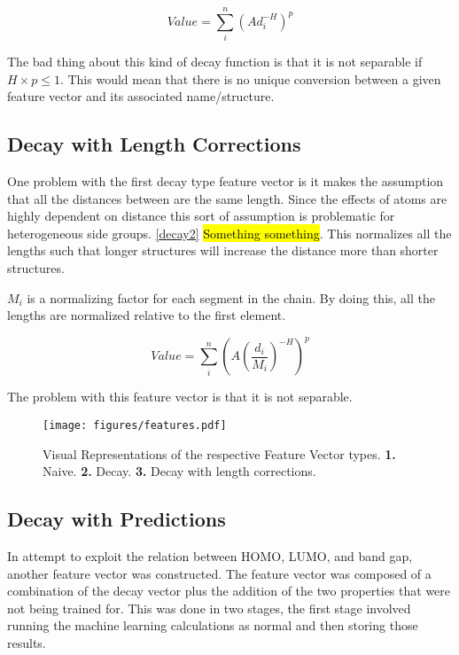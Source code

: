 \documentclass[10pt]{article}
\begin{document}
\begin{equation}\label{decay}
    Value = \sum_i^n (A d_i^{-H})^{p}
\end{equation}

The bad thing about this kind of decay function is that it is not separable if $H \times p \le 1$. This would mean that there is no unique conversion between a given feature vector and its associated name/structure.


\subsection{Decay with Length Corrections}

One problem with the first decay type feature vector is it makes the assumption that all the distances between are the same length. Since the effects of atoms are highly dependent on distance this sort of assumption is problematic for heterogeneous side groups. \eqref{decay2} \hl{Something something}. This normalizes all the lengths such that longer structures will increase the distance more than shorter structures.

$M_i$ is a normalizing factor for each segment in the chain. By doing this, all the lengths are normalized relative to the first element.

\begin{equation}\label{decay2}
    Value = \sum_i^n \left(A \left(\frac{d_i}{M_i}\right)^{-H} \right)^{p}
\end{equation}

The problem with this feature vector is that it is not separable.

\begin{figure}[H]
  \begin{center}
    \texttt{[image: figures/features.pdf]}
  \end{center}
  \caption{Visual Representations of the respective Feature Vector types. \textbf{1.} Naive. \textbf{2.} Decay. \textbf{3.} Decay with length corrections.}
  \label{fig:features}
\end{figure}

\subsection{Decay with Predictions}

In attempt to exploit the relation between HOMO, LUMO, and band gap, another feature vector was constructed. The feature vector was composed of a combination of the decay vector plus the addition of the two properties that were not being trained for. This was done in two stages, the first stage involved running the machine learning calculations as normal and then storing those results.
\end{document}
